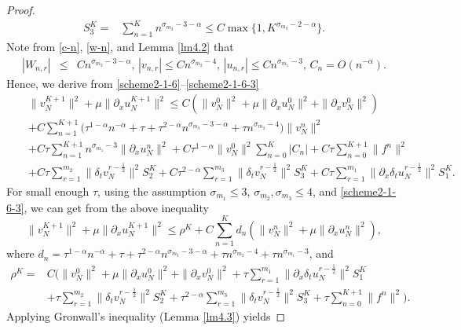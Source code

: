 \documentclass[10pt]{siamltex}
\newcommand{\px}[1][x]{\partial_{#1}}
\newcommand{\mfrac}[1][2]{\frac{1}{2}}
\begin{document}
\begin{proof}
\begin{equation}
\begin{aligned}
 S_3^K=& \sum_{n=1}^Kn^{\sigma_{m_3}-3-\alpha}\leq C\max\{1,K^{\sigma_{m_3}-2-\alpha}\}.
\end{aligned}\end{equation}
{Note from  \eqref{c-n}, \eqref{w-n}, and  Lemma \ref{lm4.2} that
\begin{eqnarray}\label{scheme2-1-5}
|W_{n,r}| &\leq& Cn^{\sigma_{m_3}-3-\alpha}, \,|v_{n,r}| \leq  Cn^{\sigma_{m_2}-4},\,
|u_{n,r}| \leq  Cn^{\sigma_{m_1}-3},  \, C_n = O(n^{-\alpha}).
\end{eqnarray}
Hence, we derive from  \eqref{scheme2-1-6}--\eqref{scheme2-1-6-3} }
\begin{eqnarray*}
&&\|v_N^{K+1}\|^2 +\mu\|\px[x]u_N^{K+1}\|^2
\leq C(\|v_N^{0}\|^2 +\mu\|\px[x]u_N^{0}\|^2+\|\px[x]v_N^{0}\|^2)\nonumber\\
&&+C\sum_{n=1}^{K+1}\Big(\tau^{1-\alpha}n^{-\alpha}+\tau
+\tau^{2-\alpha}n^{\sigma_{m_3}-3-\alpha}
+\tau  n^{\sigma_{m_2}-4}  \Big)\|v_N^{n}\|^2 \nonumber\\
&&+C\tau\sum_{n=1}^{K+1} n^{\sigma_{m_1}-3}\|\px[x]u_N^{n}\|^2
+ C\tau^{1-\alpha}\|v_N^{0}\|^2\sum_{n=0}^K|C_n|+C\tau\sum_{n=0}^{K+1}\|f^{n}\|^2\nonumber\\
&&+C \tau\sum_{r=1}^{m_2} \|\delta_tv_N^{r-\mfrac}\|^2S_2^K
+C \tau^{2-\alpha}\sum_{r=1}^{m_3} \|\delta_tv_N^{r-\mfrac}\|^2S_3^K
+C \tau\sum_{r=1}^{m_1} \|\px[x]\delta_tu_N^{r-\mfrac}\|^2S_1^K.\label{scheme2-1-7}
\end{eqnarray*}
For small enough $\tau$, using the assumption $\sigma_{m_1}\leq 3$,
$\sigma_{m_2},\sigma_{m_3}\leq 4$, and \eqref{scheme2-1-6-3},
we can get from the above inequality
\begin{equation}\label{scheme2-1-8}
\|v_N^{K+1}\|^2 +\mu\|\px[x]u_N^{K+1}\|^2\leq
\rho^K+ C\sum_{n=1}^{K}d_n(\|v_N^{n}\|^2+\mu\|\px[x]u_N^{n}\|^2),
\end{equation}
where
$d_n= \tau^{1-\alpha}n^{-\alpha}+\tau+\tau^{2-\alpha} n^{\sigma_{m_3}-3-\alpha}
+\tau  n^{\sigma_{m_2}-4} + \tau n^{\sigma_{m_1}-3}$, and
\begin{eqnarray}
\rho^K=& C\bigg(\|v_N^{0}\|^2 +\mu\|\px[x]u_N^{0}\|^2+\|\px[x]v_N^{0}\|^2
+ \tau\sum_{r=1}^{m_1} \|\px[x]\delta_tu_N^{r-\mfrac}\|^2S_1^K\nonumber\\
&+\tau\sum_{r=1}^{m_2}\|\delta_tv_N^{r-\mfrac}\|^2 S_2^K
+\tau^{2-\alpha}\sum_{r=1}^{m_3}\|\delta_tv_N^{r-\mfrac}\|^2 S_3^K
+\tau\sum_{n=0}^{K+1}\|f^{n}\|^2\bigg).\label{scheme2-1-9}
\end{eqnarray}
Applying Gronwall's inequality (Lemma \ref{lm4.3}) yields

\end{proof}
\end{document}
